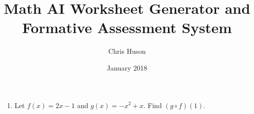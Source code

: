 \documentclass[12pt, oneside]{article}
\title{Math AI Worksheet Generator and Formative Assessment System}
\author{Chris Huson}
\date{January 2018}
\begin{document}
\begin{enumerate}

\item Let $f(x)=2x-1$ and $g(x)=-x^2+x$. Find $(g \circ f)(1)$.

\end{enumerate}
\end{document}
